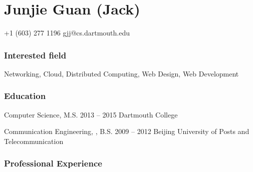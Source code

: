 \documentclass{tccv}
\begin{document}
\part{Junjie Guan (Jack)}

\begin{multicols}{2}

    {+1 (603) 277 1196}
    {gjj@cs.dartmouth.edu}

\section{Interested field}
Networking, Cloud, Distributed Computing, Web Design, Web Development


\section{Education}

\begin{yearlist}

\item[Computer Science, M.S.]{2013 -- 2015}
     {Dartmouth College}

\item[Communication Engineering, , B.S.]{2009 -- 2012}
     {Beijing University of Posts and Telecommunication}

\end{yearlist}

\end{multicols}















\section{Professional Experience}
\end{document}
